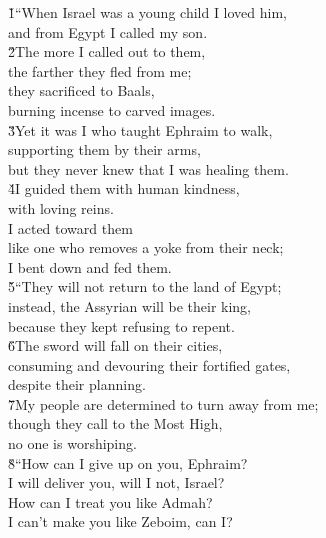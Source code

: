 \begin{poetry}
\poeml {}
\v{1}``When Israel was a young child I loved him, \\
\poemll    and from Egypt I called my son. \\
\poeml \v{2}The more I called out to them, \\
\poemll    the farther they fled from me; \\
\poeml they sacrificed to Baals, \\
\poemll    burning incense to carved images. \\
\poeml \v{3}Yet it was I who taught Ephraim to walk, \\
\poemll    supporting them by their arms, \\
\poemlll       but they never knew that I was healing them. \\
\poeml \v{4}I guided them with human kindness, \\
\poemll    with loving reins. \\
\poeml I acted toward them \\
\poemll    like one who removes a yoke from their neck; \\
\poemlll       I bent down and fed them. \\
\poeml \v{5}``They will not return to the land of Egypt; \\
\poemll    instead, the Assyrian will be their king, \\
\poemlll       because they kept refusing to repent. \\
\poeml \v{6}The sword will fall on their cities, \\
\poemll    consuming and devouring their fortified gates, \\
\poemlll       despite their planning. \\
\poeml \v{7}My people are determined to turn away from me; \\
\poemll    though they call to the Most High, \\
\poemlll       no one is worshiping. \\
\poeml \v{8}``How can I give up on you, Ephraim? \\
\poemll    I will deliver you, will I not, Israel? \\
\poeml How can I treat you like Admah? \\
\poemll    I can't make you like Zeboim, can I? \\

\end{poetry}
